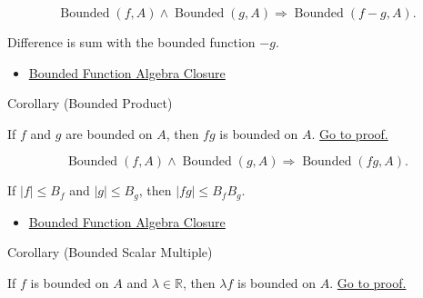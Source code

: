 \begin{remark*}
\[
  \operatorname{Bounded}(f,A)\wedge\operatorname{Bounded}(g,A)
  \Rightarrow \operatorname{Bounded}(f-g,A).
\]
\end{remark*}

\begin{remark*}[Interpretation]
Difference is sum with the bounded function \(-g\).
\end{remark*}

\begin{dependencies}
\begin{itemize}
  \item \hyperref[thm:bounded-function-algebra-closure]{Bounded Function Algebra Closure}
\end{itemize}
\end{dependencies}

\begin{corollarybox}{Corollary (Bounded Product)}
\begin{corollary}
\label{cor:bounded-product}
If \(f\) and \(g\) are bounded on \(A\), then \(fg\) is bounded on \(A\).
\hyperref[prf:bounded-product]{Go to proof.}
\end{corollary}
\end{corollarybox}

\begin{remark*}
\[
  \operatorname{Bounded}(f,A)\wedge\operatorname{Bounded}(g,A)
  \Rightarrow \operatorname{Bounded}(fg,A).
\]
\end{remark*}

\begin{remark*}[Interpretation]
If \(|f|\leq B_f\) and \(|g|\leq B_g\), then \(|fg|\leq B_fB_g\).
\end{remark*}

\begin{dependencies}
\begin{itemize}
  \item \hyperref[thm:bounded-function-algebra-closure]{Bounded Function Algebra Closure}
\end{itemize}
\end{dependencies}

\begin{corollarybox}{Corollary (Bounded Scalar Multiple)}
\begin{corollary}
\label{cor:bounded-scalar-multiple}
If \(f\) is bounded on \(A\) and \(\lambda\in\mathbb{R}\), then
\(\lambda f\) is bounded on \(A\).
\hyperref[prf:bounded-scalar-multiple]{Go to proof.}
\end{corollary}
\end{corollarybox}

